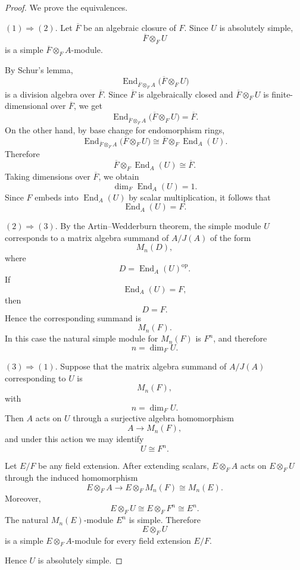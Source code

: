 \begin{proof}
    We prove the equivalences.

    \((1)\Rightarrow (2)\).
    Let \(\overline{F}\) be an algebraic closure of \(F\). Since \(U\) is absolutely
    simple,
    \[
        \overline{F}\otimes_F U
    \]
    is a simple \(\overline{F}\otimes_F A\)-module.

    By Schur's lemma,
    \[
        \operatorname{End}_{\overline{F}\otimes_F A}
        \bigl(\overline{F}\otimes_F U\bigr)
    \]
    is a division algebra over \(\overline{F}\). Since \(\overline{F}\) is algebraically
    closed and \(\overline{F}\otimes_F U\) is finite-dimensional over \(\overline{F}\),
    we get
    \[
        \operatorname{End}_{\overline{F}\otimes_F A}
        \bigl(\overline{F}\otimes_F U\bigr)
        =
        \overline{F}.
    \]
    On the other hand, by base change for endomorphism rings,
    \[
        \operatorname{End}_{\overline{F}\otimes_F A}
        \bigl(\overline{F}\otimes_F U\bigr)
        \cong
        \overline{F}\otimes_F \operatorname{End}_A(U).
    \]
    Therefore
    \[
        \overline{F}\otimes_F \operatorname{End}_A(U)
        \cong
        \overline{F}.
    \]
    Taking dimensions over \(\overline{F}\), we obtain
    \[
        \dim_F\operatorname{End}_A(U)=1.
    \]
    Since \(F\) embeds into \(\operatorname{End}_A(U)\) by scalar multiplication, it
    follows that
    \[
        \operatorname{End}_A(U)=F.
    \]

    \((2)\Rightarrow (3)\).
    By the Artin--Wedderburn theorem, the simple module \(U\) corresponds to a matrix
    algebra summand of \(A/J(A)\) of the form
    \[
        M_n(D),
    \]
    where
    \[
        D=\operatorname{End}_A(U)^{\operatorname{op}}.
    \]
    If
    \[
        \operatorname{End}_A(U)=F,
    \]
    then
    \[
        D=F.
    \]
    Hence the corresponding summand is
    \[
        M_n(F).
    \]
    In this case the natural simple module for \(M_n(F)\) is \(F^n\), and therefore
    \[
        n=\dim_F U.
    \]

    \((3)\Rightarrow (1)\).
    Suppose that the matrix algebra summand of \(A/J(A)\) corresponding to \(U\) is
    \[
        M_n(F),
    \]
    with
    \[
        n=\dim_F U.
    \]
    Then \(A\) acts on \(U\) through a surjective algebra homomorphism
    \[
        A\longrightarrow M_n(F),
    \]
    and under this action we may identify
    \[
        U\cong F^n.
    \]

    Let \(E/F\) be any field extension. After extending scalars, \(E\otimes_F A\) acts
    on \(E\otimes_F U\) through the induced homomorphism
    \[
        E\otimes_F A
        \longrightarrow
        E\otimes_F M_n(F)
        \cong
        M_n(E).
    \]
    Moreover,
    \[
        E\otimes_F U
        \cong
        E\otimes_F F^n
        \cong
        E^n.
    \]
    The natural \(M_n(E)\)-module \(E^n\) is simple. Therefore
    \[
        E\otimes_F U
    \]
    is a simple \(E\otimes_F A\)-module for every field extension \(E/F\).

    Hence \(U\) is absolutely simple.
\end{proof}

